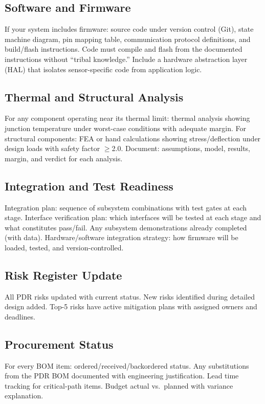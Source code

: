 \documentclass[11pt,letterpaper,twoside,openany]{book}
\begin{document}
\subsection{Software and Firmware}
If your system includes firmware: source code under version control (Git), state machine diagram, pin mapping table, communication protocol definitions, and build/flash instructions. Code must compile and flash from the documented instructions without ``tribal knowledge.'' Include a hardware abstraction layer (HAL) that isolates sensor-specific code from application logic.

\subsection{Thermal and Structural Analysis}
For any component operating near its thermal limit: thermal analysis showing junction temperature under worst-case conditions with adequate margin. For structural components: FEA or hand calculations showing stress/deflection under design loads with safety factor $\geq$2.0. Document: assumptions, model, results, margin, and verdict for each analysis.

\subsection{Integration and Test Readiness}
Integration plan: sequence of subsystem combinations with test gates at each stage. Interface verification plan: which interfaces will be tested at each stage and what constitutes pass/fail. Any subsystem demonstrations already completed (with data). Hardware/software integration strategy: how firmware will be loaded, tested, and version-controlled.

\subsection{Risk Register Update}
All PDR risks updated with current status. New risks identified during detailed design added. Top-5 risks have active mitigation plans with assigned owners and deadlines.

\subsection{Procurement Status}
For every BOM item: ordered/received/backordered status. Any substitutions from the PDR BOM documented with engineering justification. Lead time tracking for critical-path items. Budget actual vs.\ planned with variance explanation.
\end{document}
